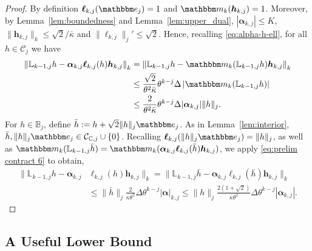 \documentclass{amsart}
\numberwithin{equation}{section}
\newcommand\cC{{\mathcal C}}
\newcommand\bB{{\mathbb B}}
\newcommand\bC{{\mathbb C}}
\newcommand\bL{{\mathbb L}}
\newcommand{\bbe}{\mathbbm e}
\newcommand{\bbm}{\mathbbm m}
\begin{document}
\begin{proof}
By definition $\boldsymbol{\ell}_{k,j}(\bbe_j)=1$ and $\bbm_k(\boldsymbol{h}_{k,j})=1$.
Moreover, 
by Lemma~\ref{lem:boundedness} and Lemma~\ref{lem:upper_dual}, 
$|\boldsymbol{\alpha}_{k,j}| \le K$, $\| \boldsymbol{h}_{k,j} \|_k \le \sqrt{2}/\bar \kappa$
and 
$\|\boldsymbol{\ell}_{k,j} \|_j' \le \sqrt{2}$.
Hence, recalling \eqref{eq:alpha-h-ell}, for all $h\in\cC_{j}$ we have
\begin{equation}
\label{eq:prelim contract 6}
\begin{split}
\left\| \bL_{k-1,j} h -\boldsymbol{\alpha}_{k,j}\boldsymbol{\ell}_{k,j}(h)\boldsymbol{h}_{k,j}\right\|_k&=\left\| \bL_{k-1,j} h - \bbm_k(\bL_{k-1,j} h)\boldsymbol{h}_{k,j}\right\|_k\\
&\leq \frac{\sqrt 2}{\theta^2\bar\kappa} \theta^{k-j}\Delta\left|\bbm_k(\bL_{k-1,j}h)\right|\\
&\leq \frac{2}{\theta^2\bar\kappa} \theta^{k-j}\Delta |\boldsymbol{\alpha}_{k,j} | \|h\|_j.
\end{split}
\end{equation}
For $h \in \bB_j$, define $\bar h := h + \sqrt{2} \| h \|_j \bbe_j$.  As in Lemma~\ref{lem:interior}, 
$\bar h, \| h \|_j \bbe_j \in \cC_{\bC,j} \cup \{ 0 \}$. 
Recalling $\boldsymbol{\ell}_{k,j}(\| h \|_j \bbe_j) = \| h \|_j$, as well as 
$\bbm_k(\bL_{k-1,j} \bar h) = \bbm_k(\boldsymbol{\alpha}_{k,j} \boldsymbol{\ell}_{k,j}(\bar h) \boldsymbol{h}_{k,j})$,
we apply \eqref{eq:prelim contract 6} to obtain,
\[
\begin{split}
\| \bL_{k-1,j} h - \boldsymbol{\alpha}_{k,j} & \boldsymbol{\ell}_{k,j}(h) \boldsymbol{h}_{k,j} \|_k
 = \| \bL_{k-1,j} \bar{h} - \boldsymbol{\alpha}_{k,j}\boldsymbol{\ell}_{k,j}(\bar{h}) \boldsymbol{h}_{k,j} \|_k \\
&  \le \| \bar h\|_j \frac{ 2}{\bar\kappa \theta^2} \Delta \theta^{k-j} |\boldsymbol{\alpha}|_{k,j}\leq \| h\|_j \frac{2(1+\sqrt{2})}{\bar\kappa \theta^2} \Delta \theta^{k-j} |\boldsymbol{\alpha}_{k,j} | .
\end{split}
\]
\end{proof}


\subsection{A Useful Lower Bound}
\label{sec:lower bound}
\end{document}
